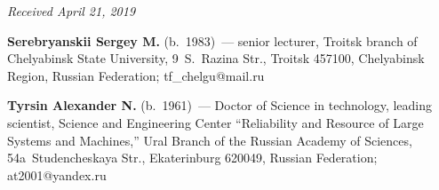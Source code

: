 
\hfill{\small\textit{Received April 21, 2019}}



\Contr

\noindent
\textbf{Serebryanskii Sergey M.} (b.\ 1983)~--- senior lecturer, Troitsk branch of 
Chelyabinsk State University, 9~S.~Razina Str., Troitsk 457100, Chelyabinsk Region, 
Russian Federation; \mbox{tf\_chelgu@mail.ru}

\vspace*{3pt}

\noindent
\textbf{Tyrsin Alexander N.} (b.\ 1961)~--- Doctor of Science in technology, leading 
scientist, Science and Engineering Center ``Reliability and Resource of Large Systems 
and Machines,'' Ural Branch of the Russian Academy of Sciences, 
54a~Studencheskaya Str., Ekaterinburg 620049, Russian Federation; 
\mbox{at2001@yandex.ru}

\label{end\stat}

\renewcommand{\bibname}{\protect\rm Литература} 